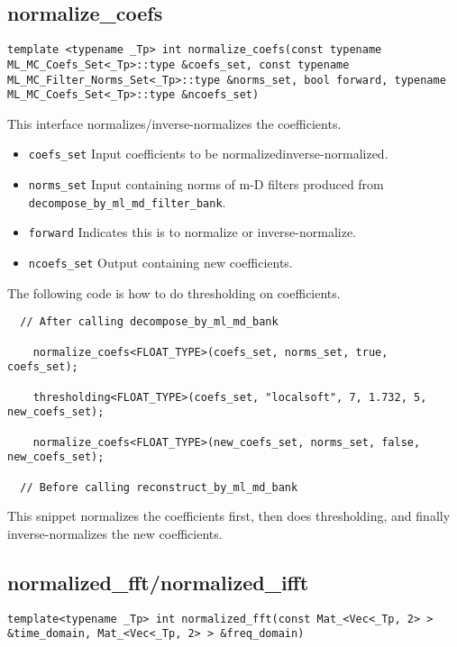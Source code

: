 \documentclass[a4paper,5pt]{article}
\begin{document}
\subsection{normalize\_coefs}

\lstinline{template <typename _Tp> int normalize_coefs(const typename ML_MC_Coefs_Set<_Tp>::type &coefs_set, const typename ML_MC_Filter_Norms_Set<_Tp>::type &norms_set, bool forward, typename ML_MC_Coefs_Set<_Tp>::type &ncoefs_set) }

This interface normalizes/inverse-normalizes the coefficients.

\begin{itemize}
\item \lstinline{coefs_set} Input coefficients to be normalized\/inverse-normalized.
\item \lstinline{norms_set} Input containing norms of m-D filters produced from \lstinline{decompose_by_ml_md_filter_bank}.
\item \lstinline{forward} Indicates this is to normalize or inverse-normalize.
\item \lstinline{ncoefs_set} Output containing new coefficients.
\end{itemize}

The following code is how to do thresholding on coefficients.

\begin{lstlisting}
  // After calling decompose_by_ml_md_bank

	normalize_coefs<FLOAT_TYPE>(coefs_set, norms_set, true, coefs_set);
	
	thresholding<FLOAT_TYPE>(coefs_set, "localsoft", 7, 1.732, 5, new_coefs_set);

	normalize_coefs<FLOAT_TYPE>(new_coefs_set, norms_set, false, new_coefs_set);
	
  // Before calling reconstruct_by_ml_md_bank
\end{lstlisting} 

  This snippet normalizes the coefficients first, then does thresholding, and finally inverse-normalizes the new coefficients.
  
\subsection{normalized\_fft/normalized\_ifft}

\lstinline{template<typename _Tp> int normalized_fft(const Mat_<Vec<_Tp, 2> > &time_domain, Mat_<Vec<_Tp, 2> > &freq_domain) }
\end{document}
